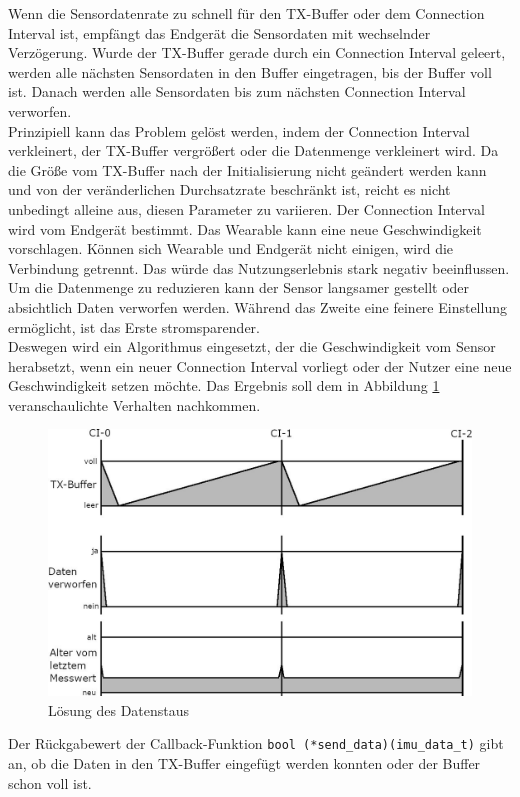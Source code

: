 Wenn die Sensordatenrate zu schnell für den TX-Buffer oder dem Connection Interval ist, empfängt das Endgerät die Sensordaten mit wechselnder Verzögerung.
Wurde der TX-Buffer gerade durch ein Connection Interval geleert, werden alle nächsten Sensordaten in den Buffer eingetragen, bis der Buffer voll ist.
Danach werden alle Sensordaten bis zum nächsten Connection Interval verworfen.\\
Prinzipiell kann das Problem gelöst werden, indem der Connection Interval verkleinert, der TX-Buffer vergrößert oder die Datenmenge verkleinert wird.
Da die Größe vom TX-Buffer nach der Initialisierung nicht geändert werden kann und von der veränderlichen Durchsatzrate beschränkt ist, reicht es nicht unbedingt alleine aus, diesen Parameter zu variieren.
Der Connection Interval wird vom Endgerät bestimmt.
Das Wearable kann eine neue Geschwindigkeit vorschlagen.
Können sich Wearable und Endgerät nicht einigen, wird die Verbindung getrennt.
Das würde das Nutzungserlebnis stark negativ beeinflussen.
Um die Datenmenge zu reduzieren kann der Sensor langsamer gestellt oder absichtlich Daten verworfen werden.
Während das Zweite eine feinere Einstellung ermöglicht, ist das Erste stromsparender.\\
Deswegen wird ein Algorithmus eingesetzt, der die Geschwindigkeit vom Sensor herabsetzt, wenn ein neuer Connection Interval vorliegt oder der Nutzer eine neue Geschwindigkeit setzen möchte.
Das Ergebnis soll dem in Abbildung \ref{fig:daten_nachher} veranschaulichte Verhalten nachkommen.
\begin{figure}[!hbtp]
	\centering
	\includegraphics[width=0.76\linewidth]{res/datenNachher.jpg}
	\caption{Lösung des Datenstaus}
	\label{fig:daten_nachher}
\end{figure}
Der Rückgabewert der Callback-Funktion \texttt{bool (*send\_data)(imu\_data\_t)} gibt an, ob die Daten in den TX-Buffer eingefügt werden konnten oder der Buffer schon voll ist.
